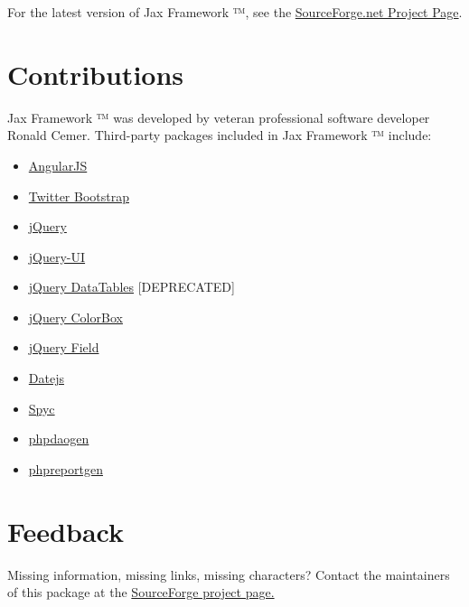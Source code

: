 \documentclass[letterpaper,10pt,english]{sphinxmanual}
\begin{document}
For the latest version of Jax Framework ™, see the \href{http://jaxframework.sourceforge.net/}{SourceForge.net Project Page}.


\section{Contributions}
\label{jaxFrameworkGuide:contributions}
Jax Framework ™ was developed by veteran professional software developer Ronald Cemer.
Third-party packages included in Jax Framework ™ include:
\begin{itemize}
\item {} 
\href{https://angularjs.org/}{AngularJS}

\item {} 
\href{http://twitter.github.com/bootstrap/}{Twitter Bootstrap}

\item {} 
\href{http://jquery.com/}{jQuery}

\item {} 
\href{http://jqueryui.com/}{jQuery-UI}

\item {} 
\href{http://datatables.net/}{jQuery DataTables} {[}DEPRECATED{]}

\item {} 
\href{http://www.jacklmoore.com/colorbox/}{jQuery ColorBox}

\item {} 
\href{http://www.pengoworks.com/workshop/jquery/field/field.plugin.htm}{jQuery Field}

\item {} 
\href{http://www.datejs.com/}{Datejs}

\item {} 
\href{https://code.google.com/p/spyc/}{Spyc}

\item {} 
\href{http://phpdaogen.sourceforge.net/}{phpdaogen}

\item {} 
\href{http://phpreportgen.sourceforge.net/}{phpreportgen}

\end{itemize}


\section{Feedback}
\label{jaxFrameworkGuide:feedback}
Missing information, missing links, missing characters?  Contact the maintainers of this package at
the \href{http://jaxframework.sourceforge.net/}{SourceForge project page.}
\end{document}
